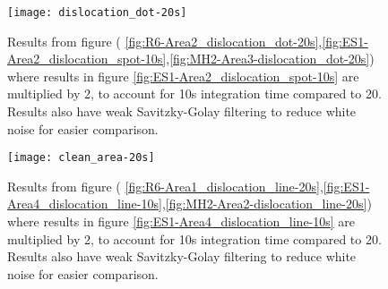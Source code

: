 \begin{figure}[H]
\centering
\texttt{[image: dislocation\_dot-20s]}
\caption[Comparisons in a dislocation dot]{Results from figure ( \ref{fig:R6-Area2_dislocation_dot-20s},\ref{fig:ES1-Area2_dislocation_spot-10s},\ref{fig:MH2-Area3-dislocation_dot-20s}) where results in figure \ref{fig:ES1-Area2_dislocation_spot-10s} are multiplied by 2, to account for 10s integration time compared to 20. Results also have weak Savitzky-Golay filtering to reduce white noise for easier comparison.}
\label{fig:dislocation_dot-20s_comparison}%
\end{figure}



\begin{figure}[H]
\centering
\texttt{[image: clean\_area-20s]}
\caption[Comparisons in a dislocation line]{Results from figure ( \ref{fig:R6-Area1_dislocation_line-20s},\ref{fig:ES1-Area4_dislocation_line-10s},\ref{fig:MH2-Area2-dislocation_line-20s}) where results in figure \ref{fig:ES1-Area4_dislocation_line-10s} are multiplied by 2, to account for 10s integration time compared to 20. Results also have weak Savitzky-Golay filtering to reduce white noise for easier comparison.}
\label{fig:dislocation_line-20s_comparison}%
\end{figure}
